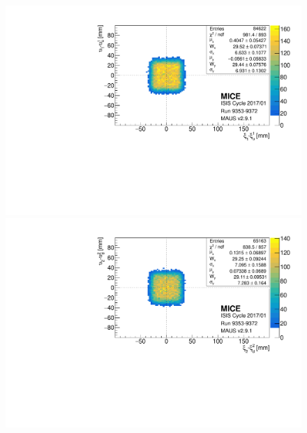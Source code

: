 \begin{figure} [!htb]
	\centering
	\begin{minipage}[b]{.475\textwidth}
		\centering
		\includegraphics[width=\textwidth]{data_test/tof1_xy_res.pdf}
	\end{minipage}
	\hfill
	\begin{minipage}[b]{.475\textwidth}
		\centering
		\includegraphics[width=\textwidth]{data_test/tof2_xy_res.pdf}
	\end{minipage}
	

\end{figure}
